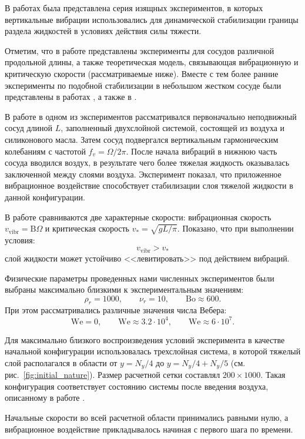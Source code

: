 \documentclass[12pt,a4paper]{article}
\begin{document}
В работах \cite{Apffel2020, Apffel2022} была представлена серия изящных экспериментов, в которых вертикальные вибрации использовались для динамической стабилизации границы раздела жидкостей в условиях действия силы тяжести.

Отметим, что в работе \cite{Apffel2020} представлены эксперименты для сосудов различной продольной длины, а также теоретическая модель, связывающая вибрационную и критическую скорости (рассматриваемые ниже). Вместе с тем более ранние эксперименты по подобной стабилизации в небольшом жестком сосуде были представлены в работах \cite{Bezdenezhnykh1982, Bezdenezhnykh1983}, а также в \cite{Wolf1969, Wolf1970}.

В работе \cite{Apffel2020} в одном из экспериментов рассматривался первоначально неподвижный сосуд длиной $L$, заполненный двухслойной системой, состоящей из воздуха и силиконового масла. Затем сосуд подвергался вертикальным гармоническим колебаниям с частотой $f_v = \Omega/2\pi.$
После начала вибраций в нижнюю часть сосуда вводился воздух, в результате чего более тяжелая жидкость оказывалась заключенной между слоями воздуха. Эксперимент показал, что приложенное вибрационное воздействие способствует стабилизации слоя тяжелой жидкости в данной конфигурации.

В работе \cite{Apffel2020} сравниваются две характерные скорости: вибрационная скорость $v_{\mathrm{vibr}} = \mathrm{B} \Omega$ и критическая скорость $v_* = \sqrt{gL/\pi}.$
Показано, что при выполнении условия:
$$
v_{\mathrm{vibr}} > v_*
$$
слой жидкости может устойчиво <<левитировать>> под действием вибраций.

Физические параметры проведенных нами численных экспериментов были выбраны максимально близкими к экспериментальным значениям:
$$
\rho_r=1000, \qquad \nu_r=10, \qquad \mathrm{Bo} \approx 600.
$$
При этом рассматривались различные значения числа Вебера:
$$
\mathrm{We}=0, \qquad \mathrm{We} \approx 3.2 \cdot 10^4, \qquad \mathrm{We} \approx 6 \cdot 10^7.
$$

Для максимально близкого воспроизведения условий эксперимента в качестве начальной конфигурации использовалась трехслойная система, в которой тяжелый слой располагался в области от $y = N_y/4$ до $y = N_y/4 + N_y/5$ (см. рис.~\ref{fig:initial_nature}). Размер расчетной сетки составлял $200 \times 1000$. Такая конфигурация соответствует состоянию системы после введения воздуха, описанному в работе \cite{Apffel2020}.

Начальные скорости во всей расчетной области принимались равными нулю, а вибрационное воздействие прикладывалось начиная с первого шага по времени.
\end{document}
